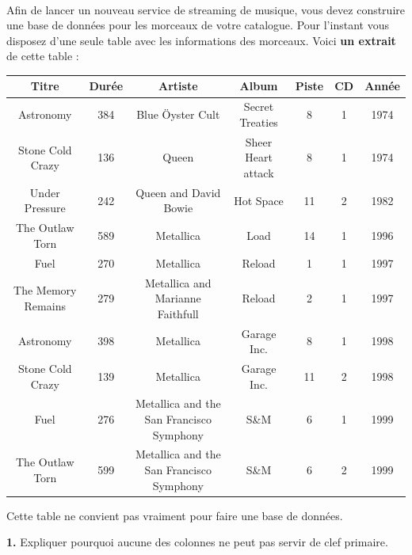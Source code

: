 \documentclass[a4paper,10pt,french]{book}
\begin{document}

\exo\\
Afin de lancer un nouveau service de streaming de musique, vous devez construire une base de données pour les morceaux de votre catalogue. Pour l’instant vous disposez d’une seule table avec les informations des morceaux. Voici \textbf{un extrait} de cette table :

\begin{center}
    \footnotesize
    \begin{tabular}{|c|c|c|c|c|c|c|}
        \hline
        \rowcolor{UGLiOrange} \color{white}\textbf{Titre} &\color{white}\textbf{Durée}&\color{white}\textbf{Artiste}	&\color{white}\textbf{Album}&\color{white}\textbf{Piste}&\color{white}\textbf{CD}	& \color{white}\textbf{Année}\\
        \hline
        Astronomy			&384	&Blue Öyster Cult 							&Secret Treaties		&8	&1	&1974\\
        \hline
        Stone Cold Crazy	&136	&Queen										&Sheer Heart attack		&8	&1	&1974\\
        \hline
        Under Pressure		&242 	&Queen and David Bowie						&Hot Space				&11	&2	&1982\\
        \hline
        The Outlaw Torn 	&589 	&Metallica									&Load					&14	&1	&1996\\
        \hline
        Fuel				&270 	&Metallica									&Reload					&1	&1	&1997\\
        \hline
        The Memory Remains	&279 	&Metallica and Marianne Faithfull			&Reload					&2	&1	&1997\\
        \hline
        Astronomy			&398 	&Metallica									&Garage Inc.			&8	&1	&1998\\
        \hline
        Stone Cold Crazy	&139	&Metallica									&Garage Inc.			&11	&2	&1998\\
        \hline
        Fuel				&276 	&Metallica and the San Francisco Symphony	&S\&M					&6	&1	&1999\\
        \hline
        The Outlaw Torn		&599	&Metallica and the San Francisco Symphony	&S\&M 					&6	&2	&1999\\
        \hline
    \end{tabular}			
\end{center}			

Cette table ne convient pas vraiment pour faire une base de données.

\textbf{1.} Expliquer pourquoi aucune des colonnes ne peut pas servir de clef primaire.\\
\end{document}
